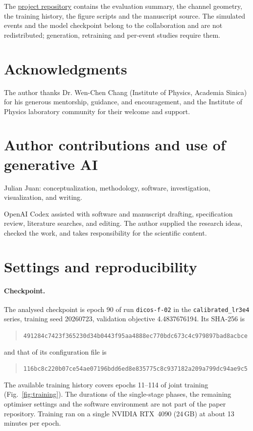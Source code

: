 \documentclass[11pt]{article}
\begin{document}
The \href{https://github.com/JulianAttemptsCoding/fast-mc-paper}{project repository} contains the evaluation summary, the channel geometry, the training history, the figure scripts and the manuscript source. The simulated events and the model checkpoint belong to the collaboration and are not redistributed; generation, retraining and per-event studies require them.

\section*{Acknowledgments}

The author thanks Dr. Wen-Chen Chang (Institute of Physics, Academia Sinica) for his generous mentorship, guidance, and encouragement, and the Institute of Physics laboratory community for their welcome and support.

\section*{Author contributions and use of generative AI}

Julian Juan: conceptualization, methodology, software, investigation, visualization, and writing.

OpenAI Codex assisted with software and manuscript drafting, specification review, literature searches, and editing. The author supplied the research ideas, checked the work, and takes responsibility for the scientific content.

\appendix
\section{Settings and reproducibility}
\label{app:reproducibility}

\paragraph{Checkpoint.} The analysed checkpoint is epoch 90 of run \texttt{dicos-f-02} in the \texttt{calibrated\_lr3e4} series, training seed 20260723, validation objective 4.4837676194. Its SHA-256 is
\begin{quote}\footnotesize\nolinkurl{491284c7423f365230d34b0443f95aa4888ec770bdc673c4c979897bad8acbce}\end{quote}
and that of its configuration file is
\begin{quote}\footnotesize\nolinkurl{116bc8c220b07ce54ae07196bdd6ed8e835775c8c937182a209a799dc94ae9c5}\end{quote}
The available training history covers epochs 11--114 of joint training (Fig.~\ref{fig:training}). The durations of the single-stage phases, the remaining optimiser settings and the software environment are not part of the paper repository. Training ran on a single NVIDIA RTX~4090 (24\,GB) at about 13 minutes per epoch.
\end{document}
